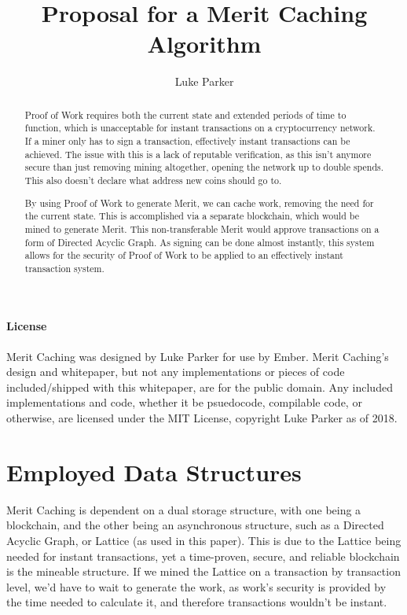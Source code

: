 \documentclass[14pt]{article}
\title{Proposal for a Merit Caching Algorithm}
\author{Luke Parker}
\begin{document}
\maketitle

\begin{abstract}
Proof of Work requires both the current state and extended periods of time to function, which is unacceptable for instant transactions on a cryptocurrency network. If a miner only has to sign a transaction, effectively instant transactions can be achieved. The issue with this is a lack of reputable verification, as this isn't anymore secure than just removing mining altogether, opening the network up to double spends. This also doesn't declare what address new coins should go to.

By using Proof of Work to generate Merit, we can cache work, removing the need for the current state. This is accomplished via a separate blockchain, which would be mined to generate Merit. This non-transferable Merit would approve transactions on a form of Directed Acyclic Graph. As signing can be done almost instantly, this system allows for the security of Proof of Work to be applied to an effectively instant transaction system.
\end{abstract}

\paragraph{License}
Merit Caching was designed by Luke Parker for use by Ember. Merit Caching's design and whitepaper, but not any implementations or pieces of code included/shipped with this whitepaper, are for the public domain. Any included implementations and code, whether it be psuedocode, compilable code, or otherwise, are licensed under the MIT License, copyright Luke Parker as of 2018.

\newpage

\setcounter{tocdepth}{3}
\tableofcontents

\newpage

\section{Employed Data Structures}
Merit Caching is dependent on a dual storage structure, with one being a blockchain, and the other being an asynchronous structure, such as a Directed Acyclic Graph, or Lattice (as used in this paper). This is due to the Lattice being needed for instant transactions, yet a time-proven, secure, and reliable blockchain is the mineable structure. If we mined the Lattice on a transaction by transaction level, we'd have to wait to generate the work, as work's security is provided by the time needed to calculate it, and therefore transactions wouldn't be instant.
\end{document}
